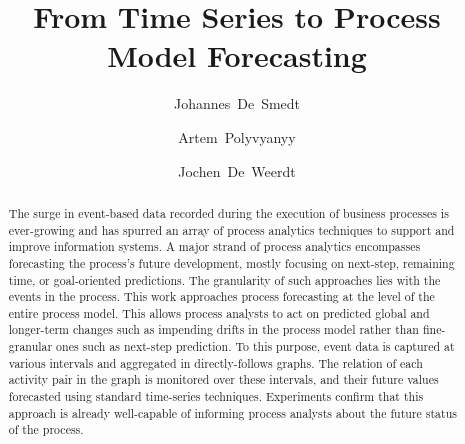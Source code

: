 \documentclass{svproc}
\begin{document}
\mainmatter      
%
\title{From Time Series to Process Model Forecasting}
%
%
\author{Johannes~De~Smedt \and Artem~Polyvyanyy \and Jochen~De~Weerdt}
%
%
\maketitle              

\begin{abstract}
The surge in event-based data recorded during the execution of business processes is ever-growing and has spurred an array of process analytics techniques to support and improve information systems.
A major strand of process analytics encompasses forecasting the process's future development, mostly focusing on next-step, remaining time, or goal-oriented predictions.
The granularity of such approaches lies with the events in the process.
This work approaches process forecasting at the level of the entire process model.
This allows process analysts to act on predicted global and longer-term changes such as impending drifts in the process model rather than fine-granular ones such as next-step prediction.
To this purpose, event data is captured at various intervals and aggregated in directly-follows graphs.
The relation of each activity pair in the graph is monitored over these intervals, and their future values forecasted using standard time-series techniques.
Experiments confirm that this approach is already well-capable of informing process analysts about the future status of the process.
\end{abstract}
%





%
%



\end{document}
